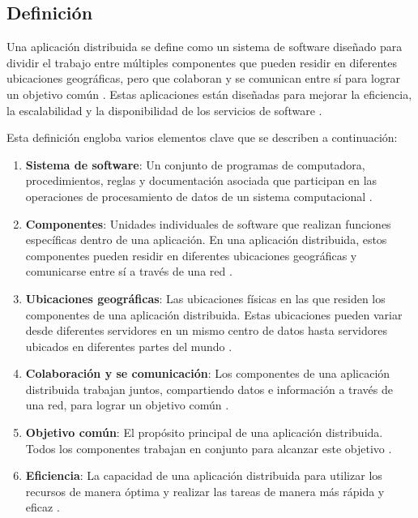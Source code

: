 \subsection{Definición}
\noindent
Una aplicación distribuida se define como un sistema de software diseñado para dividir el trabajo entre múltiples componentes que pueden residir en diferentes ubicaciones geográficas, pero que colaboran y se comunican entre sí para lograr un objetivo común \cite{Zeng2012distributed,Urquhart2021flow}. Estas aplicaciones están diseñadas para mejorar la eficiencia, la escalabilidad y la disponibilidad de los servicios de software \cite{Litiu2001,Barcellos1994hetnos}.

Esta definición engloba varios elementos clave que se describen a continuación:

\begin{enumerate}
	\item \textbf{Sistema de software}: 
	Un conjunto de programas de computadora, procedimientos, reglas y documentación asociada que participan en las operaciones de procesamiento de datos de un sistema computacional \cite{Ekenstedt2023}.
	
	\item \textbf{Componentes}: 
	Unidades individuales de software que realizan funciones específicas dentro de una aplicación. En una aplicación distribuida, estos componentes pueden residir en diferentes ubicaciones geográficas y comunicarse entre sí a través de una red \cite{Zeng2012distributed}.
	
	\item \textbf{Ubicaciones geográficas}: 
	Las ubicaciones físicas en las que residen los componentes de una aplicación distribuida. Estas ubicaciones pueden variar desde diferentes servidores en un mismo centro de datos hasta servidores ubicados en diferentes partes del mundo \cite{Zeng2012distributed}.
	
	\item \textbf{Colaboración y se comunicación}: 
	Los componentes de una aplicación distribuida trabajan juntos, compartiendo datos e información a través de una red, para lograr un objetivo común \cite{Urquhart2021flow}.
	
	\item \textbf{Objetivo común}: 
	El propósito principal de una aplicación distribuida. Todos los componentes trabajan en conjunto para alcanzar este objetivo \cite{Kanjula2023distributed}.
	
	\item \textbf{Eficiencia}: 
	La capacidad de una aplicación distribuida para utilizar los recursos de manera óptima y realizar las tareas de manera más rápida y eficaz \cite{Cai2023distributed}.
	

\end{enumerate}
